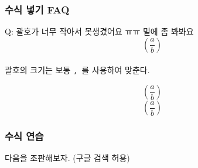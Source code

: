 \documentclass[aspectratio={169}]{beamer}
\begin{document}
\begin{frame}
    \frametitle{수식 넣기 FAQ}

    Q: 괄호가 너무 작아서 못생겼어요 ㅠㅠ 밑에 좀 봐봐요
    \[ (\frac{a}{b}) \]
    \\

    괄호의 크기는 보통 \texttt{\left, \right}를 사용하여 맞춘다.

    \texttt{\[ \left(\frac{a}{b}\right) \]}
    \[ \left(\frac{a}{b}\right) \]
\end{frame}


\begin{frame}
    \frametitle{수식 연습}

    다음을 조판해보자. (구글 검색 허용) \\

\end{frame}
\end{document}
